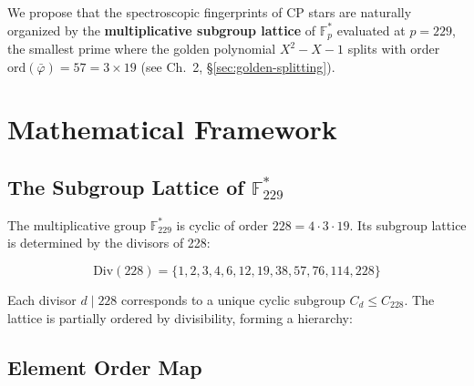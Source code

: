 We propose that the spectroscopic fingerprints of CP stars are naturally organized
by the \textbf{multiplicative subgroup lattice} of $\mathbb{F}_p^*$ evaluated at
$p = 229$, the smallest prime where the golden polynomial $X^2 - X - 1$ splits
with order $\text{ord}(\bar\varphi) = 57 = 3 \times 19$
(see Ch.~2, \S\ref{sec:golden-splitting}).

\section{Mathematical Framework}
\label{sec:stellar-math}

\subsection{The Subgroup Lattice of $\mathbb{F}_{229}^*$}

The multiplicative group $\mathbb{F}_{229}^*$ is cyclic of order $228 = 4 \cdot 3 \cdot 19$.
Its subgroup lattice is determined by the divisors of 228:

\begin{equation}
\text{Div}(228) = \{1, 2, 3, 4, 6, 12, 19, 38, 57, 76, 114, 228\}
\end{equation}

Each divisor $d \mid 228$ corresponds to a unique cyclic subgroup $C_d \leq C_{228}$.
The lattice is partially ordered by divisibility, forming a hierarchy:

\begin{center}
\end{center}

\subsection{Element Order Map}

